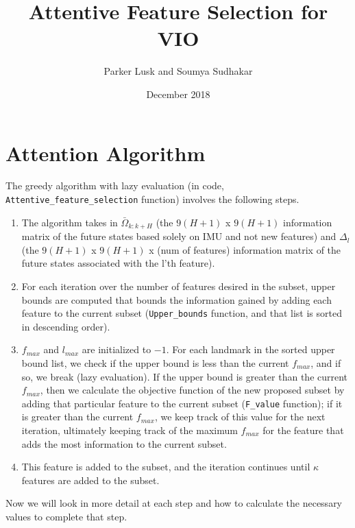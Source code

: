 \documentclass{article}
\title{Attentive Feature Selection for VIO}
\author{Parker Lusk and Soumya Sudhakar}
\date{December 2018}
\begin{document}
\maketitle

\section{Attention Algorithm}
The greedy algorithm with lazy evaluation (in code, \texttt{Attentive\_feature\_selection} function) involves the following steps. 
\begin{enumerate}
    \item The algorithm takes in $\bar{\Omega}_{k:k+H}$ (the $9(H+1)$ x $9(H+1)$ information matrix of the future states based solely on IMU and not new features) and $\Delta_l$ (the $9(H+1)$ x $9(H+1)$ x (num of features) information matrix of the future states associated with the l'th feature).
    \item For each iteration over the number of features desired in the subset, upper bounds are computed that bounds the information gained by adding each feature to the current subset (\texttt{Upper\_bounds} function, and that list is sorted in descending order).
    \item $f_{max}$ and $l_{max}$ are initialized to $-1$. For each landmark in the sorted upper bound list, we check if the upper bound is less than the current $f_{max}$, and if so, we break (lazy evaluation). If the upper bound is greater than the current $f_{max}$, then we calculate the objective function of the new proposed subset by adding that particular feature to the current subset (\texttt{F\_value} function); if it is greater than the current $f_{max}$, we keep track of this value for the next iteration, ultimately keeping track of the maximum $f_{max}$ for the feature that adds the most information to the current subset.
    \item This feature is added to the subset, and the iteration continues until $\kappa$ features are added to the subset.
\end{enumerate}
Now we will look in more detail at each step and how to calculate the necessary values to complete that step.
\end{document}
